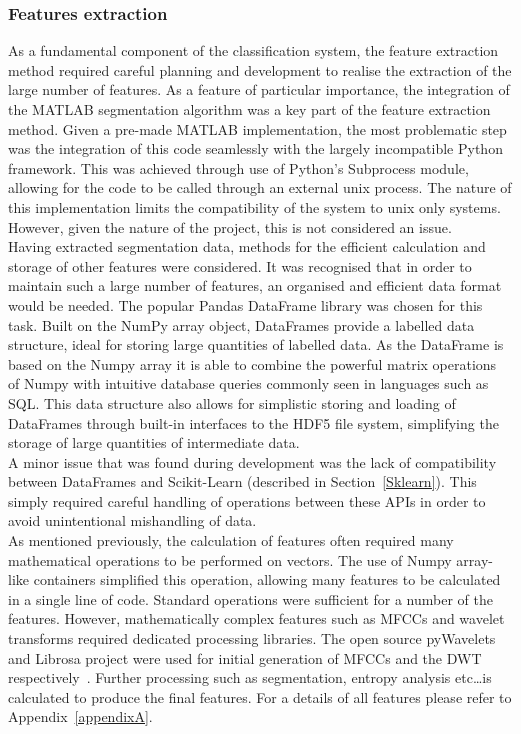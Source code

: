 \documentclass[titlepage, 12pt]{scrartcl} \usepackage{enumitem}
\begin{document}
\subsubsection{Features extraction}
As a fundamental component of the classification system, the feature extraction
method required careful planning and development to realise the extraction of
the large number of features. As a feature of particular importance, the
integration of the MATLAB segmentation algorithm was a key part of the feature
extraction method. Given a pre-made MATLAB implementation, the most problematic
step was the integration of this code seamlessly with the largely incompatible
Python framework. This was achieved through use of Python's Subprocess module,
allowing for the code to be called through an external unix process. The nature
of this implementation limits the compatibility of the system to unix only
systems. However, given the nature of the project, this is not considered an
issue.\\

Having extracted segmentation data, methods for the efficient calculation and
storage of other features were considered. It was recognised that in order to
maintain such a large number of features, an organised and efficient data
format would be needed. The popular Pandas DataFrame library was chosen for
this task. Built on the NumPy array object, DataFrames provide a labelled data
structure, ideal for storing large quantities of labelled data. As the DataFrame
is based on the Numpy array it is able to combine the powerful matrix
operations of Numpy with intuitive database queries commonly seen in languages
such as SQL. This data structure also allows for simplistic storing and loading
of DataFrames through built-in interfaces to the HDF5 file system, simplifying
the storage of large quantities of intermediate data.\\
A minor issue that was found during development was the lack of compatibility
between DataFrames and Scikit-Learn (described in Section~\ref{Sklearn}). This
simply required careful handling of operations between these APIs in order to
avoid unintentional mishandling of data.\\

As mentioned previously, the calculation of features often required many
mathematical operations to be performed on vectors. The use of Numpy array-like
containers simplified this operation, allowing many features to be calculated
in a single line of code. Standard operations were sufficient for a number of
the features. However, mathematically complex features such as MFCCs and
wavelet transforms required dedicated processing libraries. The open source
pyWavelets and Librosa project were used for initial generation of MFCCs and
the DWT respectively~\parencite{pyWave, Mcfee2015}. Further processing such as
segmentation, entropy analysis etc\ldots is calculated to produce the final
features. For a details of all features please refer to
Appendix~\ref{appendixA}.\\
\end{document}
